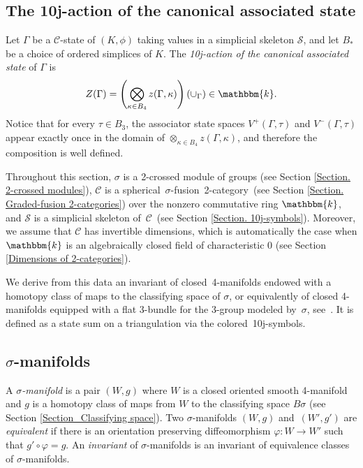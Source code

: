 \documentclass[a4paper, oneside]{amsart}
\makeatletter
\let\origsection\section
\renewcommand\section{\@ifstar{\starsection}{\nostarsection}}
\newcommand\nostarsection[1]
{\sectionprelude\origsection{#1}\sectionpostlude}
\newcommand\starsection[1]
{\sectionprelude\origsection*{#1}\sectionpostlude}
\newcommand\sectionprelude{%
  \vspace{1em}
}
\newcommand\sectionpostlude{%
  \vspace{1em}
}
\numberwithin{equation}{subsection}
\theoremstyle{referencedlemma}
\theoremstyle{plain} %
\theoremstyle{remark}
\makeatother
\begin{document}
\subsection{The 10j-action of the canonical associated state}
Let $\Gamma$ be a $\mathcal{C}$-state of $(K, \phi)$ taking values in a simplicial skeleton $\mathcal{S}$, and let $B_*$ be a choice of ordered simplices of $K$. The \emph{10j-action of the canonical associated state} of $\Gamma$ is
\begin{equation*}
Z(\Gamma) = \left( \bigotimes_{\kappa \in B_4} z(\Gamma, \kappa)\right) (\cup_\Gamma ) \in \mathbbm{k}.
\end{equation*}
Notice that for every $\tau\in B_3$, the associator state spaces $V^+(\Gamma, \tau)$ and $V^-(\Gamma, \tau)$ appear exactly once in the domain of $ \otimes_{\kappa \in B_4} z(\Gamma, \kappa)$, and therefore the composition is well defined. 

\section{The state sum for $\sigma$-manifolds}\label{Section. State sum}

\noindent Throughout this section, $\sigma$ is a 2-crossed module of groups (see Section \ref{Section. 2-crossed modules}),  $\mathcal{C}$ is a spherical~$\sigma$-fusion~2-category~(see Section \ref{Section. Graded-fusion 2-categories}) over the nonzero commutative ring $\mathbbm{k}$, and $\mathcal{S}$ is a simplicial skeleton of~$\mathcal{C}$~(see Section \ref{Section. 10j-symbols}). Moreover, we assume that $\mathcal{C}$ has invertible dimensions, which is automatically the case when $\mathbbm{k}$ is an algebraically closed field of characteristic 0 (see Section \ref{Dimensions of 2-categories}). 

We derive from this data an invariant of closed~4-manifolds endowed with a homotopy class of maps to the classifying space of $\sigma$, or equivalently of closed 4-manifolds equipped with a flat 3-bundle for the 3-group modeled by~$\sigma$, see~\cite{Cellot_thesis_2026}. It is defined as a state sum on a triangulation via the colored~10j-symbols.

\subsection{$\sigma$-manifolds}\label{sigma manifolds}

A \emph{$\sigma$-manifold} is a pair $(W,g)$ where $W$ is a closed oriented smooth 4-manifold and $g$ is a homotopy class of maps from $W$ to the classifying space $B\sigma$ (see Section \ref{Section_Classifying space}).  Two $\sigma$-manifolds $(W,g)$ and~$(W',g')$ are \emph{equivalent} if there is an orientation preserving diffeomorphism $\varphi \colon W \to W'$ such that $g' \circ \varphi =g$.  An \emph{invariant} of $\sigma$-manifolds is an invariant of equivalence classes of $\sigma$-manifolds. 
\end{document}
